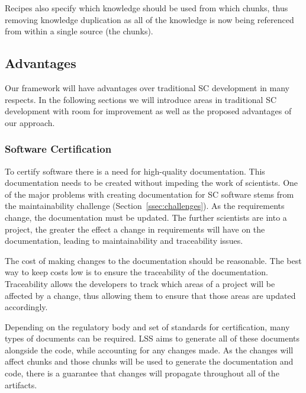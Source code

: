 \documentclass{sig-alternate-05-2015}
\newcommand{\lss}{LSS}
\begin{document}
Recipes also specify which knowledge should be used from which chunks, thus
removing knowledge duplication as all of the knowledge is now being referenced
from within a single source (the chunks).


\subsection{Advantages} \label{ssec:advantages}

Our framework will have %
advantages over traditional SC development in many respects. In the following
sections we will introduce areas in traditional SC development with room for
improvement as well as the proposed advantages of our approach.

\subsubsection{Software Certification} \label{sssec:adv_cert}

To certify software there is a need for high-quality documentation. This
documentation needs to be created without impeding the work of scientists. One
of the major problems with creating documentation for SC software stems from the
maintainability challenge (Section~\ref{ssec:challenges}). As the requirements
change, the documentation must be updated. The further scientists are into a
project, the greater the effect a change in requirements will have on the
documentation, leading to maintainability and traceability issues.

The cost of making changes to the documentation should be reasonable. The best
way to keep costs low is to ensure the traceability of the documentation.
Traceability allows the developers to track which areas of a project will be
affected by a change, thus allowing them to ensure that those areas are updated
accordingly.

Depending on the regulatory body and set of standards for certification, many
types of documents can be required. \lss{} aims to generate all of these
documents alongside the code, while accounting for any changes made. As the
changes will affect chunks and those chunks will be used to generate the
documentation and code, there is a guarantee that changes will propagate
throughout all of the artifacts.
\end{document}
